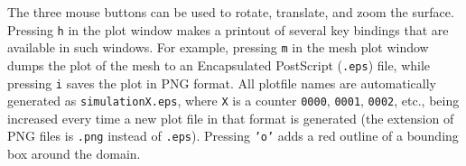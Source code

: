 The three mouse buttons can be used to rotate, translate, and zoom
the surface.
Pressing {\fontsize{10pt}{10pt}\texttt{h}} in the plot window makes a printout of several
key bindings that are available in such windows. For example,
pressing {\fontsize{10pt}{10pt}\texttt{m}} in the mesh plot window
dumps the plot of the mesh to an Encapsulated PostScript ({\fontsize{10pt}{10pt}\texttt{.eps}})
file, while pressing {\fontsize{10pt}{10pt}\texttt{i}} saves the plot in PNG format.
All plotfile names are automatically generated as {\fontsize{10pt}{10pt}\texttt{simulationX.eps}},
where {\fontsize{10pt}{10pt}\texttt{X}} is a counter {\fontsize{10pt}{10pt}\texttt{0000}}, {\fontsize{10pt}{10pt}\texttt{0001}}, {\fontsize{10pt}{10pt}\texttt{0002}}, etc.,
being increased every time a new plot file in that format
is generated (the extension
of PNG files is {\fontsize{10pt}{10pt}\texttt{.png}} instead of {\fontsize{10pt}{10pt}\texttt{.eps}}).
Pressing {\fontsize{10pt}{10pt}\texttt{'o'}} adds a red outline of a bounding box around the domain.

